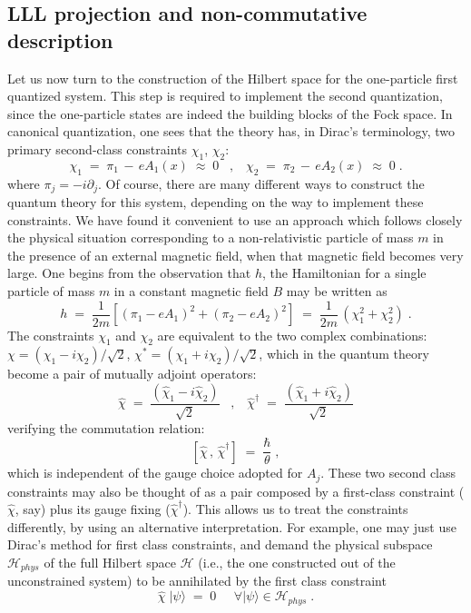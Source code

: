 \documentclass[a4paper,12pt]{article}
\begin{document}
\subsection{LLL projection and non-commutative description}

Let us now turn to the construction of the Hilbert space for the
one-particle first quantized system. This step is required to
implement the second quantization, since the one-particle states
are
indeed the building blocks of the Fock space. In canonical
quantization, one sees that the theory has, in Dirac's terminology,
two primary second-class constraints $\chi_1$, $\chi_2$:
\begin{equation}
  \label{eq:defcs}
\chi_1 \;=\; \pi_1 \,-\, e A_1(x) \;\approx\; 0 \;\;\;,\;\;\;
\chi_2 \;=\; \pi_2 \,-\, e A_2(x) \;\approx\; 0 \;.
\end{equation}
where $\pi_j=-i \partial_j$. Of course, there are many different
ways to
construct the quantum theory for this system, depending on the way
to
implement these constraints.  We have found it convenient to use an
approach which follows closely the physical situation corresponding
to
a non-relativistic particle of mass $m$ in the presence of an
external
magnetic field, when that magnetic field becomes very large. One
begins from the observation that $h$, the Hamiltonian for a single
particle of mass $m$ in a constant magnetic field $B$ may be
written
as
\begin{equation}
  \label{eq:cons1}
h\;=\; \frac{1}{2m} [(\pi_1 - e A_1)^2 + (\pi_2 - e A_2)^2 ]
\;=\; \frac{1}{2m} \, ( \chi_1^2 + \chi_2^2) \;.
\end{equation}
The constraints $\chi_1$ and $\chi_2$ are equivalent to the two
complex
combinations: $\chi = (\chi_1 - i \chi_2)/\sqrt{2}$, $\chi^* =
(\chi_1 + i
\chi_2)/\sqrt{2}$, which in the quantum theory become a pair of
mutually
adjoint operators:
\begin{equation}
  \label{eq:const2}
 {\hat \chi}\;=\;\frac{({\hat \chi}_1 - i {\hat \chi}_2)}{\sqrt{2}}
\;\;\;,\;\;\;
 {\hat \chi}^\dagger \;=\;\frac{({\hat \chi}_1 + i {\hat
\chi}_2)}{\sqrt{2}}
\end{equation}
verifying the commutation relation:
\begin{equation}
  \label{eq:const3}
[{\hat \chi}\,,\, {\hat \chi}^\dagger ] \;=\; \frac{\hbar}{\theta}
\;,
\end{equation}
which is independent of the gauge choice adopted for $A_j$.  These
two
second class constraints may also be thought of as a pair composed
by
a first-class constraint (${\hat \chi}$, say) plus its gauge fixing
(${\hat \chi}^\dagger$). This allows us to treat the constraints
differently,
by using an alternative interpretation. For example, one may just
use
Dirac's method for first class constraints, and demand the physical
subspace ${\mathcal H}_{phys}$ of the full Hilbert space ${\mathcal
  H}$ (i.e., the one constructed out of the unconstrained system)
to
be annihilated by the first class constraint
\begin{equation}
  \label{eq:phys}
{\hat \chi} \; | \psi \rangle \;=\; 0  \;\;\;\;\; \forall |\psi
\rangle 
\in {\mathcal H}_{phys} \;. 
\end{equation}
\end{document}
